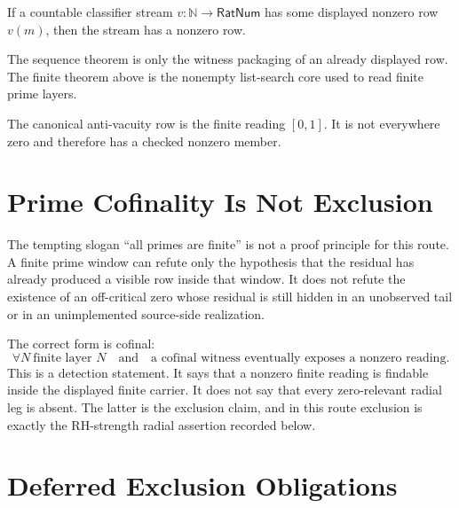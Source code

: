 \begin{theorem}
\label{thm:rh-layerwise-prime-cofinality-seq}
If a countable classifier stream $v:\mathbb N\to\mathsf{RatNum}$ has
some displayed nonzero row $v(m)$, then the stream has a nonzero row.
\end{theorem}

The sequence theorem is only the witness packaging of an already displayed
row. The finite theorem above is the nonempty list-search core used to
read finite prime layers.

\begin{definition}
\label{def:rh-layerwise-prime-cofinality-canonical-reading}
The canonical anti-vacuity row is the finite reading $[0,1]$. It is not
everywhere zero and therefore has a checked nonzero member.
\end{definition}

\section{Prime Cofinality Is Not Exclusion}
\label{sec:rh-layerwise-prime-cofinality-not-exclusion}

The tempting slogan ``all primes are finite'' is not a proof principle
for this route. A finite prime window can refute only the hypothesis that
the residual has already produced a visible row inside that window. It
does not refute the existence of an off-critical zero whose residual is
still hidden in an unobserved tail or in an unimplemented source-side
realization.

The correct form is cofinal:
$$
\forall N\ \text{finite layer } N
\quad\text{and}\quad
\text{a cofinal witness eventually exposes a nonzero reading}.
$$
This is a detection statement. It says that a nonzero finite reading is
findable inside the displayed finite carrier. It does not say that every
zero-relevant radial leg is absent. The latter is the exclusion claim,
and in this route exclusion is exactly the RH-strength radial assertion
recorded below.

\section{Deferred Exclusion Obligations}
\label{sec:rh-layerwise-prime-cofinality-obligations}

